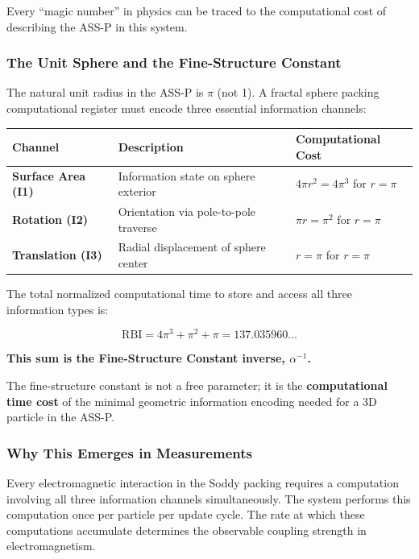 \documentclass[11pt,a4paper]{article}
\begin{document}
Every ``magic number'' in physics can be traced to the computational cost of describing the ASS-P in this system.

\subsubsection{The Unit Sphere and the Fine-Structure Constant}

The natural unit radius in the ASS-P is $\pi$ (not 1). A fractal sphere packing computational register must encode three essential information channels:

\begin{table}[h]
\centering
\begin{tabular}{|l|p{3.5cm}|p{3cm}|}
\hline
\textbf{Channel} & \textbf{Description} & \textbf{Computational Cost} \\
\hline
\textbf{Surface Area (I1)} & Information state on sphere exterior & $4\pi r^2 = 4\pi^3$ for $r=\pi$ \\
\hline
\textbf{Rotation (I2)} & Orientation via pole-to-pole traverse & $\pi r = \pi^2$ for $r=\pi$ \\
\hline
\textbf{Translation (I3)} & Radial displacement of sphere center & $r = \pi$ for $r=\pi$ \\
\hline
\end{tabular}
\end{table}

The total normalized computational time to store and access all three information types is:

\begin{equation}
\text{RBI} = 4\pi^3 + \pi^2 + \pi = 137.035960\ldots
\end{equation}

\noindent\textbf{This sum is the Fine-Structure Constant inverse, $\alpha^{-1}$.}

The fine-structure constant is not a free parameter; it is the \textbf{computational time cost} of the minimal geometric information encoding needed for a 3D particle in the ASS-P.

\subsubsection{Why This Emerges in Measurements}

Every electromagnetic interaction in the Soddy packing requires a computation involving all three information channels simultaneously. The system performs this computation once per particle per update cycle. The rate at which these computations accumulate determines the observable coupling strength in electromagnetism.
\end{document}
